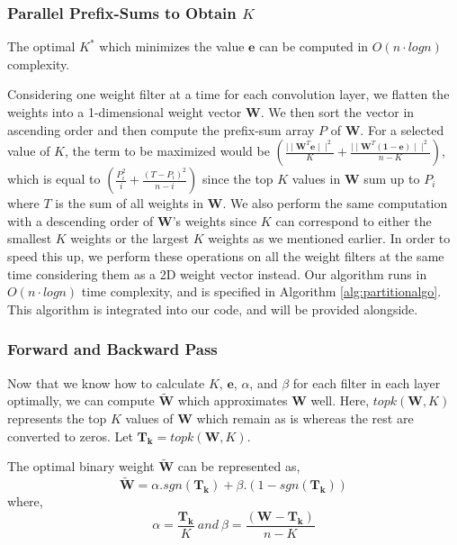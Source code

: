 \subsubsection{Parallel Prefix-Sums to Obtain $K$}
\begin{theorem}
\label{theorem:approx}
The optimal $K^*$ which minimizes the value $\mathbf{e}$ can be computed in $O(n \cdot logn)$ complexity.
\end{theorem}

\noindent Considering one weight filter at a time for each convolution layer, we flatten the weights into a 1-dimensional weight vector $\mathbf{W}$. We then sort the vector in ascending order and then compute the prefix-sum array $P$ of $\mathbf{W}$. For a selected value of $K$, the term to be maximized would be $(\frac{\mid\mid\mathbf{\mathbf{W}}^T\mathbf{e}\mid\mid^2}{K}+\frac{\mid\mid\mathbf{W}^T\mathbf{(1-e)}\mid\mid^2}{n-K})$, which is equal to $(\frac{P_{i}^{2}}{i} + \frac{(T-P_{i})^{2}}{n-i})$ since the top $K$ values in $\mathbf{W}$ sum up to $P_{i}$ where $T$ is the sum of all weights in $\mathbf{W}$. We also perform the same computation with a descending order of $\mathbf{W}$'s weights since $K$ can correspond to either the smallest $K$ weights or the largest $K$ weights as we mentioned earlier. In order to speed this up, we perform these operations on all the weight filters at the same time considering them as a 2D weight vector instead. Our algorithm runs in $O(n \cdot logn)$ time complexity, and is specified in Algorithm \ref{alg:partitionalgo}. This algorithm is integrated into our code, and will be provided alongside.

\subsubsection{Forward and Backward Pass}
\noindent Now that we know how to calculate $K$, $\mathbf{e}$, $\alpha$, and $\beta$ for each filter in each layer optimally, we can compute $\widetilde{\mathbf{W}}$ which approximates $\mathbf{W}$ well. Here, $topk(\mathbf{W},K)$ represents the top $K$ values of $\mathbf{W}$ which remain as is whereas the rest are converted to zeros. Let $\mathbf{T_k} = topk(\mathbf{W}, K)$.

\begin{corollary}\label{corollary:forward}
The optimal binary weight $\widetilde{\mathbf{W}}$ can be represented as,
\[
\widetilde{\mathbf{W}} = \alpha.sgn(\mathbf{T_k}) + \beta.(1-sgn(\mathbf{T_k}))
\]
where,
\[
\alpha = \frac{\mathbf{T_k}}{K} \ and \ 
\beta = \frac{(\mathbf{W}-\mathbf{T_k})}{n-K}
\]
\end{corollary}

